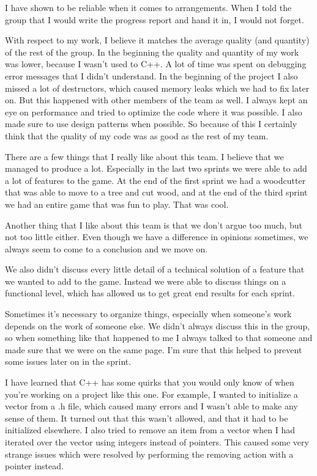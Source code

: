 I have shown to be reliable when it comes to arrangements. When I told the group that I would write the progress report and hand it in, I would not forget.

With respect to my work, I believe it matches the average quality (and quantity) of the rest of the group. In the beginning the quality and quantity of my work was lower, because I wasn’t used to C++. A lot of time was spent on debugging error messages that I didn’t understand. In the beginning of the project I also missed a lot of destructors, which caused memory leaks which we had to fix later on. But this happened with other members of the team as well. I always kept an eye on performance and tried to optimize the code where it was possible. I also made sure to use design patterns when possible. So because of this I certainly think that the quality of my code was as good as the rest of my team.

There are a few things that I really like about this team. I believe that we managed to produce a lot. Especially in the last two sprints we were able to add a lot of features to the game. At the end of the first sprint we had a woodcutter that was able to move to a tree and cut wood, and at the end of the third sprint we had an entire game that was fun to play. That was cool.

Another thing that I like about this team is that we don’t argue too much, but not too little either. Even though we have a difference in opinions sometimes, we always seem to come to a conclusion and we move on. 

We also didn’t discuss every little detail of a technical solution of a feature that we wanted to add to the game. Instead we were able to discuss things on a functional level, which has allowed us to get great end results for each sprint.

Sometimes it’s necessary to organize things, especially when someone’s work depends on the work of someone else. We didn’t always discuss this in the group, so when something like that happened to me I always talked to that someone and made sure that we were on the same page. I’m sure that this helped to prevent some issues later on in the sprint.

I have learned that C++ has some quirks that you would only know of when you’re working on a project like this one. For example, I wanted to initialize a vector from a .h file, which caused many errors and I wasn’t able to make any sense of them. It turned out that this wasn’t allowed, and that it had to be initialized elsewhere. I also tried to remove an item from a vector when I had iterated over the vector using integers instead of pointers. This caused some very strange issues which were resolved by performing the removing action with a pointer instead.

